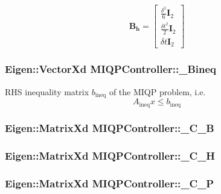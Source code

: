 \[ \mathbf{B_h} = \left[ \begin{array}{c} \frac{\delta^3}{6}\mathbf{I}_2 \\ \frac{\delta t^2}{2} \mathbf{I}_2 \\ \delta t \mathbf{I}_2 \end{array} \right] \] \hypertarget{classMIQPController_a02d441467a51e81e969163f096d3798a}{
\subsubsection[{\-\_\-\-Bineq}]{\setlength{\rightskip}{0pt plus 5cm}\-Eigen\-::\-Vector\-Xd {\bf \-M\-I\-Q\-P\-Controller\-::\-\_\-\-Bineq}}}\label{classMIQPController_a02d441467a51e81e969163f096d3798a}
\-R\-H\-S inequality matrix $b_{\text{ineq}}$ of the \-M\-I\-Q\-P problem, i.\-e. \[ A_{\text{ineq}} x \leq b_{\text{ineq}} \] \hypertarget{classMIQPController_a5c6882cb248e9d16513868fea7835d6e}{
\subsubsection[{\-\_\-\-C\-\_\-\-B}]{\setlength{\rightskip}{0pt plus 5cm}\-Eigen\-::\-Matrix\-Xd {\bf \-M\-I\-Q\-P\-Controller\-::\-\_\-\-C\-\_\-\-B}}}\label{classMIQPController_a5c6882cb248e9d16513868fea7835d6e}
\hypertarget{classMIQPController_a323718c0eaf8c8a7e159ea7f1ef5b72c}{
\subsubsection[{\-\_\-\-C\-\_\-\-H}]{\setlength{\rightskip}{0pt plus 5cm}\-Eigen\-::\-Matrix\-Xd {\bf \-M\-I\-Q\-P\-Controller\-::\-\_\-\-C\-\_\-\-H}}}\label{classMIQPController_a323718c0eaf8c8a7e159ea7f1ef5b72c}
\hypertarget{classMIQPController_a17cf6f8279cf6b2ce333feb9c8fc5a5d}{
\subsubsection[{\-\_\-\-C\-\_\-\-P}]{\setlength{\rightskip}{0pt plus 5cm}\-Eigen\-::\-Matrix\-Xd {\bf \-M\-I\-Q\-P\-Controller\-::\-\_\-\-C\-\_\-\-P}}}\label{classMIQPController_a17cf6f8279cf6b2ce333feb9c8fc5a5d}
